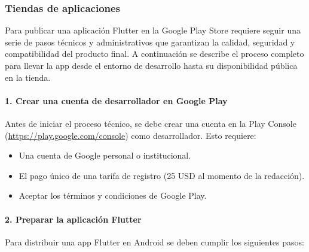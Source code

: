 \newpage
\subsubsection*{Tiendas de aplicaciones}
Para publicar una aplicación Flutter en la Google Play Store requiere seguir una serie de pasos técnicos y administrativos que garantizan la calidad, seguridad y compatibilidad del producto final. A continuación se describe el proceso completo para llevar la app desde el entorno de desarrollo hasta su disponibilidad pública en la tienda.

\paragraph{1. Crear una cuenta de desarrollador en Google Play}

Antes de iniciar el proceso técnico, se debe crear una cuenta en la Play Console (\url{https://play.google.com/console}) como desarrollador. Esto requiere:

\begin{itemize}
    \item Una cuenta de Google personal o institucional.
    \item El pago único de una tarifa de registro (25 USD al momento de la redacción).
    \item Aceptar los términos y condiciones de Google Play.
\end{itemize}

\paragraph{2. Preparar la aplicación Flutter}

Para distribuir una app Flutter en Android se deben cumplir los siguientes pasos:

